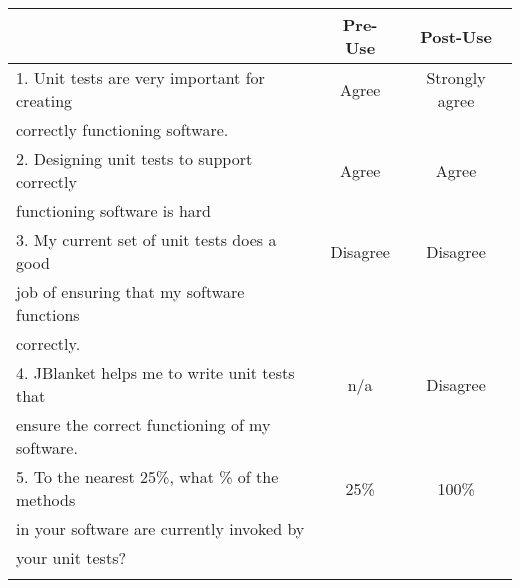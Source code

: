 \begin{tabular}{lcc} \\
 & {\bf Pre-Use} & {\bf Post-Use} \\ \hline
1. Unit tests are very important for creating & Agree & Strongly agree \\
   correctly functioning software. \\ \hline

2. Designing unit tests to support correctly & Agree & Agree \\
   functioning software is hard\\ \hline

3. My current set of unit tests does a good & Disagree & Disagree \\
   job of ensuring that my software functions \\
   correctly.\\ \hline

4. JBlanket helps me to write unit tests that & n/a & Disagree \\
   ensure the correct functioning of my software.\\ \hline

5. To the nearest 25\%, what \% of the methods & 25\% & 100\% \\
   in your software are currently invoked by \\
   your unit tests?\\ \hline
\\
\end{tabular}

